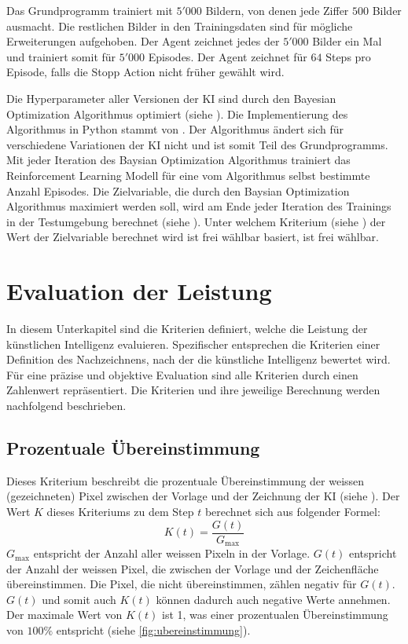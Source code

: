  
Das Grundprogramm trainiert mit $5'000$ Bildern, von denen jede Ziffer $500$
Bilder ausmacht. Die restlichen Bilder in den Trainingsdaten sind für mögliche 
Erweiterungen aufgehoben. Der Agent zeichnet jedes der $5'000$ Bilder ein Mal und
trainiert somit für $5'000$ Episodes. Der Agent zeichnet für $64$ Steps pro
Episode, falls die Stopp Action nicht früher gewählt wird.
 
Die Hyperparameter aller Versionen der KI sind durch den Bayesian Optimization
Algorithmus optimiert (siehe ). Die Implementierung
des Algorithmus in Python stammt von \cite{fernando_nogueira_bayesian_2014}. Der
Algorithmus ändert sich für verschiedene Variationen der KI nicht und ist somit
Teil des Grundprogramms. Mit jeder Iteration des Baysian Optimization
Algorithmus trainiert das Reinforcement Learning Modell für eine vom Algorithmus
selbst bestimmte Anzahl Episodes. Die Zielvariable, die durch den Baysian
Optimization Algorithmus maximiert werden soll, wird am Ende jeder Iteration des
Trainings in der Testumgebung berechnet (siehe ).
Unter welchem Kriterium (siehe ) der Wert der
Zielvariable berechnet wird ist frei wählbar  
basiert, ist frei wählbar.
 
\section{Evaluation der Leistung}\label{chap:m_eval} In diesem Unterkapitel sind
die Kriterien definiert, welche die Leistung der künstlichen Intelligenz
evaluieren. Spezifischer entsprechen die Kriterien einer Definition des
Nachzeichnens, nach der die künstliche Intelligenz bewertet wird. Für eine
präzise und objektive Evaluation sind alle Kriterien durch einen Zahlenwert
repräsentiert. Die Kriterien und ihre jeweilige Berechnung werden nachfolgend
beschrieben.

\subsection{Prozentuale Übereinstimmung}\label{sub:m_eval_proc}
Dieses Kriterium beschreibt die prozentuale Übereinstimmung der weissen
(gezeichneten) Pixel zwischen der Vorlage und der Zeichnung der KI (siehe
). Der Wert $K$ dieses Kriteriums zu dem Step $t$
berechnet sich aus folgender Formel:
\[ K(t) = \frac{G(t)}{G_{\max}} \] $G_{\max}$ entspricht der Anzahl aller
weissen Pixeln in der Vorlage. $G(t)$ entspricht der Anzahl der weissen Pixel,
die zwischen der Vorlage und der Zeichenfläche übereinstimmen. Die Pixel, die
nicht übereinstimmen, zählen negativ für $G(t)$. $G(t)$ und somit auch $K(t)$
können dadurch auch negative Werte annehmen. Der maximale Wert von $K(t)$ ist 1,
was einer prozentualen Übereinstimmung von $100\%$ entspricht (siehe
\autoref{fig:ubereinstimmung}).
 
